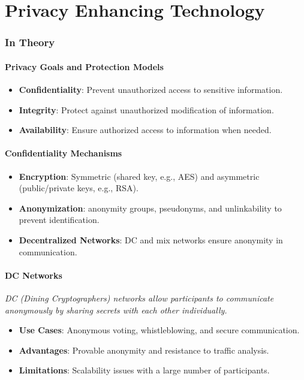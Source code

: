 \documentclass{article}
\author{Leopold Lemmermann}
\begin{document}
\createtitle


\part{Privacy Enhancing Technology}
\section{In Theory}

\subsection{Privacy Goals and Protection Models}
\begin{itemize}
  \item \textbf{Confidentiality}: Prevent unauthorized access to sensitive information.
  \item \textbf{Integrity}: Protect against unauthorized modification of information.
  \item \textbf{Availability}: Ensure authorized access to information when needed.
\end{itemize}

\subsection{Confidentiality Mechanisms}
\begin{itemize}
  \item \textbf{Encryption}: Symmetric (shared key, e.g., AES) and asymmetric (public/private keys, e.g., RSA).
  \item \textbf{Anonymization}: anonymity groups, pseudonyms, and unlinkability to prevent identification.
  \item \textbf{Decentralized Networks}: DC and mix networks ensure anonymity in communication.
\end{itemize}

\subsection{DC Networks}

\textit{DC (Dining Cryptographers) networks allow participants to communicate anonymously by sharing secrets with each other individually.}
\begin{itemize}
  \item \textbf{Use Cases}: Anonymous voting, whistleblowing, and secure communication.
  \item \textbf{Advantages}: Provable anonymity and resistance to traffic analysis.
  \item \textbf{Limitations}: Scalability issues with a large number of participants.
\end{itemize}
\end{document}
